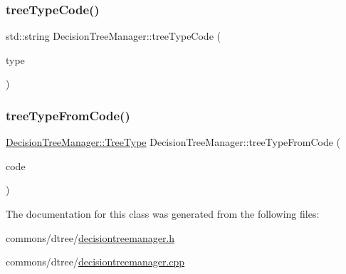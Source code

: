 \subsubsection{\texorpdfstring{treeTypeCode()}{treeTypeCode()}}
{\footnotesize\ttfamily std\+::string Decision\+Tree\+Manager\+::tree\+Type\+Code (\begin{DoxyParamCaption}\item[{\mbox{\hyperlink{classdtree_1_1_decision_tree_manager_a14180eb59d2c245ce3af1c27ddb0846d}{Decision\+Tree\+Manager\+::\+Tree\+Type}}}]{type }\end{DoxyParamCaption})\hspace{0.3cm}{\ttfamily [static]}}

\mbox{\label{classdtree_1_1_decision_tree_manager_aba3d26531d22ef36993e535ec0bf9b26}} 
\subsubsection{\texorpdfstring{treeTypeFromCode()}{treeTypeFromCode()}}
{\footnotesize\ttfamily \mbox{\hyperlink{classdtree_1_1_decision_tree_manager_a14180eb59d2c245ce3af1c27ddb0846d}{Decision\+Tree\+Manager\+::\+Tree\+Type}} Decision\+Tree\+Manager\+::tree\+Type\+From\+Code (\begin{DoxyParamCaption}\item[{std\+::string}]{code }\end{DoxyParamCaption})\hspace{0.3cm}{\ttfamily [static]}}



The documentation for this class was generated from the following files\+:\begin{DoxyCompactItemize}
\item 
commons/dtree/\mbox{\hyperlink{decisiontreemanager_8h}{decisiontreemanager.\+h}}\item 
commons/dtree/\mbox{\hyperlink{decisiontreemanager_8cpp}{decisiontreemanager.\+cpp}}\end{DoxyCompactItemize}
